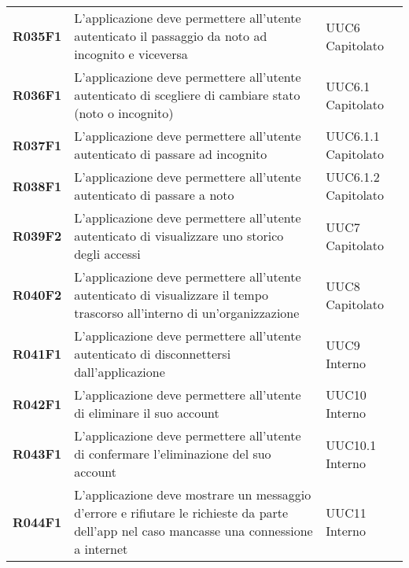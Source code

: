 \documentclass[../analisi-dei-requisiti.tex]{subfiles}
\begin{document}
\begin{longtable}[H]{>{\centering\bfseries}m{3cm} >{\centering}m{10cm} >{\centering\arraybackslash}m{3cm}}
  R035F1                               & L'applicazione deve permettere all'utente autenticato il passaggio da noto ad incognito e viceversa                                                                                                     & UUC6 Capitolato               \\
  R036F1                               & L'applicazione deve permettere all'utente autenticato di scegliere di cambiare stato (noto o incognito)                                                                                                 & UUC6.1 Capitolato             \\
  R037F1                               & L'applicazione deve permettere all'utente autenticato di passare ad incognito                                                                                                                           & UUC6.1.1 Capitolato           \\
  R038F1                               & L'applicazione deve permettere all'utente autenticato di passare a noto                                                                                                                                 & UUC6.1.2 Capitolato           \\
  R039F2                               & L'applicazione deve permettere all'utente autenticato di visualizzare uno storico degli accessi                                                                                                         & UUC7 Capitolato               \\
  R040F2                               & L'applicazione deve permettere all'utente autenticato di visualizzare il tempo trascorso all'interno di un'organizzazione                                                                               & UUC8 Capitolato               \\
  R041F1                               & L'applicazione deve permettere all'utente autenticato di disconnettersi dall'applicazione                                                                                                               & UUC9 Interno                  \\
  R042F1                               & L'applicazione deve permettere all'utente di eliminare il suo account                                                                                                                                   & UUC10 Interno                 \\
  R043F1                               & L'applicazione deve permettere all'utente di confermare l'eliminazione del suo account                                                                                                                  & UUC10.1 Interno               \\
  R044F1                               & L'applicazione deve mostrare un messaggio d'errore e rifiutare le richieste da parte dell'app nel caso mancasse una connessione a internet                                                              & UUC11 Interno                 \\


\end{longtable}
\end{document}
